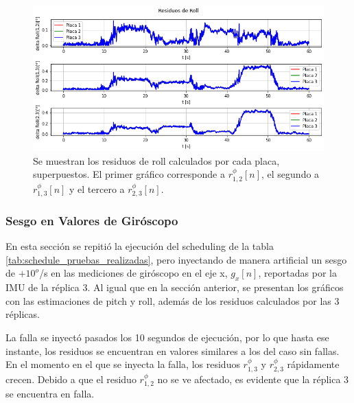 \begin{figure}[htb]
    \centering
    \includegraphics[width=\textwidth]{img/resultados_residuos_roll_sin_fallas.png}
    \caption{Se muestran los residuos de roll calculados por cada placa, superpuestos. El primer gráfico corresponde a $r_{1,2}^{\phi}[n]$, el segundo a $r_{1,3}^{\phi}[n]$ y el tercero a $r_{2,3}^{\phi}[n]$.}
    \label{fig:resultados_residuos_roll_sin_fallas}
\end{figure}

\subsubsection{Sesgo en Valores de Giróscopo}

En esta sección se repitió la ejecución del scheduling de la tabla \ref{tab:schedule_pruebas_realizadas}, pero inyectando de manera artificial un sesgo de $+10 ^{o}$/s en las mediciones de giróscopo en el eje x, $g_x[n]$, reportadas por la IMU de la réplica 3. Al igual que en la sección anterior, se presentan los gráficos con las estimaciones de pitch y roll, además de los residuos calculados por las 3 réplicas.

La falla se inyectó pasados los 10 segundos de ejecución, por lo que hasta ese instante, los residuos se encuentran en valores similares a los del caso sin fallas. En el momento en el que se inyecta la falla, los residuos $r_{1,3}^{\phi}$ y $r_{2,3}^{\phi}$ rápidamente crecen. Debido a que el residuo $r_{1,2}^{\phi}$ no se ve afectado, es evidente que la réplica 3 se encuentra en falla.

